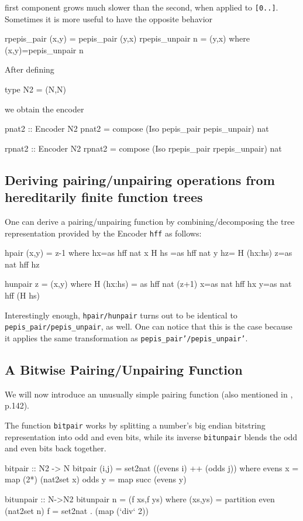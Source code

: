 \documentclass[]{INCLUDES/llncs}
\begin{document}
first component grows much slower than the second, when applied to {\tt [0..]}.
Sometimes it is more useful to have the opposite behavior
\begin{code}
rpepis_pair (x,y) = pepis_pair (y,x)
rpepis_unpair n = (y,x) where (x,y)=pepis_unpair n
\end{code}
After defining
\begin{code}
type N2 = (N,N)
\end{code}
we obtain the encoder
\begin{code}
pnat2 :: Encoder N2
pnat2 = compose (Iso pepis_pair pepis_unpair) nat

rpnat2 :: Encoder N2
rpnat2 = compose (Iso rpepis_pair rpepis_unpair) nat
\end{code}

\subsection{Deriving pairing/unpairing operations from hereditarily finite
function trees}
One can derive a pairing/unpairing function by combining/decomposing
the tree representation provided by the Encoder {\tt hff} as follows:
\begin{code}
hpair (x,y) = z-1 where 
  hx=as hff nat x
  H hs =as hff nat y
  hz= H (hx:hs)
  z=as nat hff hz
    
hunpair z = (x,y) where
  H (hx:hs) = as hff nat (z+1)
  x=as nat hff hx
  y=as nat hff (H hs)
\end{code}
Interestingly enough, {\tt hpair/hunpair} turns out to be identical to
{\tt pepis\_pair/pepis\_unpair}, as well. One can notice that this is the case
because it applies the same transformation as {\tt pepis\_pair'/pepis\_unpair'}.

\subsection{A Bitwise Pairing/Unpairing Function}
We will now introduce an unusually simple pairing function 
(also mentioned in \cite{pigeon}, p.142).

The function {\tt bitpair} works by splitting a 
number's big endian bitstring
representation into odd and even bits, 
while its inverse {\tt bitunpair}
blends the odd and even bits back together.

\begin{code}
bitpair ::  N2 -> N
bitpair (i,j) = 
  set2nat ((evens i) ++ (odds j)) where
    evens x = map (2*) (nat2set x)
    odds y = map succ (evens y)

bitunpair :: N->N2  
bitunpair n = (f xs,f ys) where 
  (xs,ys) = partition even (nat2set n)
  f = set2nat . (map (`div` 2))
\end{code}
\end{document}
